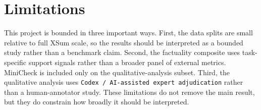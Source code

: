 \documentclass[11pt]{article}
\begin{document}
\section*{Limitations}

This project is bounded in three important ways. First, the data splits are
small relative to full XSum scale, so the results should be interpreted as a
bounded study rather than a benchmark claim. Second, the factuality composite
uses task-specific support signals rather than a broader panel of external
metrics. MiniCheck is included only on the qualitative-analysis subset. Third,
the qualitative analysis uses
\texttt{Codex / AI-assisted expert adjudication} rather than a
human-annotator study. These limitations do not remove the main result, but
they do constrain how broadly it should be interpreted.



\end{document}
